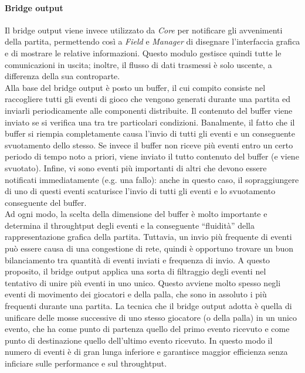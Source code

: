 \paragraph{Bridge output}\label{sec:analisi_distribuzione_bridge_output} Il bridge output viene invece utilizzato da \textit{Core} per notificare gli avvenimenti della partita, permettendo così a \textit{Field} e \textit{Manager} di disegnare l'interfaccia grafica e di mostrare le relative informazioni. Questo modulo gestisce quindi tutte le comunicazioni in uscita; inoltre, il flusso di dati trasmessi è solo uscente, a differenza della sua controparte.\\

Alla base del bridge output è posto un buffer, il cui compito consiste nel raccogliere tutti gli eventi di gioco che vengono generati durante una partita ed inviarli periodicamente alle componenti distribuite. Il contenuto del buffer viene inviato se si verifica una tra tre particolari condizioni. Banalmente, il fatto che il buffer si riempia completamente causa l'invio di tutti gli eventi e un conseguente svuotamento dello stesso. Se invece il buffer non riceve più eventi entro un certo periodo di tempo noto a priori, viene inviato il tutto contenuto del buffer (e viene svuotato). Infine, vi sono eventi più importanti di altri che devono essere notificati immediatamente (e.g. una fallo): anche in questo caso, il sopraggiungere di uno di questi eventi scaturisce l'invio di tutti gli eventi e lo svuotamento conseguente del buffer.\\

Ad ogni modo, la scelta della dimensione del buffer è molto importante e determina il throughtput degli eventi e la conseguente ``fluidità'' della rappresentazione grafica della partita. Tuttavia, un invio più frequente di eventi può essere causa di una congestione di rete, quindi è opportuno trovare un buon bilanciamento tra quantità di eventi inviati e frequenza di invio. A questo proposito, il bridge output applica una sorta di filtraggio degli eventi nel tentativo di unire più eventi in uno unico. Questo avviene molto spesso negli eventi di movimento dei giocatori e della palla, che sono in assoluto i più frequenti durante una partita. La tecnica che il bridge output adotta è quella di unificare delle mosse successive di uno stesso giocatore (o della palla) in un unico evento, che ha come punto di partenza quello del primo evento ricevuto e come punto di destinazione quello dell'ultimo evento ricevuto. In questo modo il numero di eventi è di gran lunga inferiore e garantisce maggior efficienza senza inficiare sulle performance e sul throughtput.

